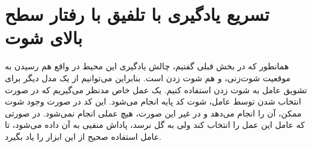 \section{تسریع یادگیری با تلفیق با رفتار سطح بالای شوت}
همانطور که در بخش قبلی گفتیم، چالش یادگیری این محیط در واقع هم رسیدن به موقعیت شوت‌زنی، و هم شوت زدن است.
بنابراین می‌توانیم از یک مدل دیگر برای تشویق عامل به شوت زدن استفاده کنیم.
یک عمل خاص مدنظر می‌گیریم که در صورت انتخاب شدن توسط عامل، شوت کد پایه  
انجام می‌شود. این کد در صورت وجود شوت ممکن، آن را انجام می‌دهد و در غیر این صورت، هیچ عملی انجام نمی‌شود.
در صورتی که عامل این عمل را انتخاب کند ولی به گل نرسد، پاداش منفیی به آن داده می‌شود، تا عامل استفاده صحیح از این ابزار را یاد بگیرد.
